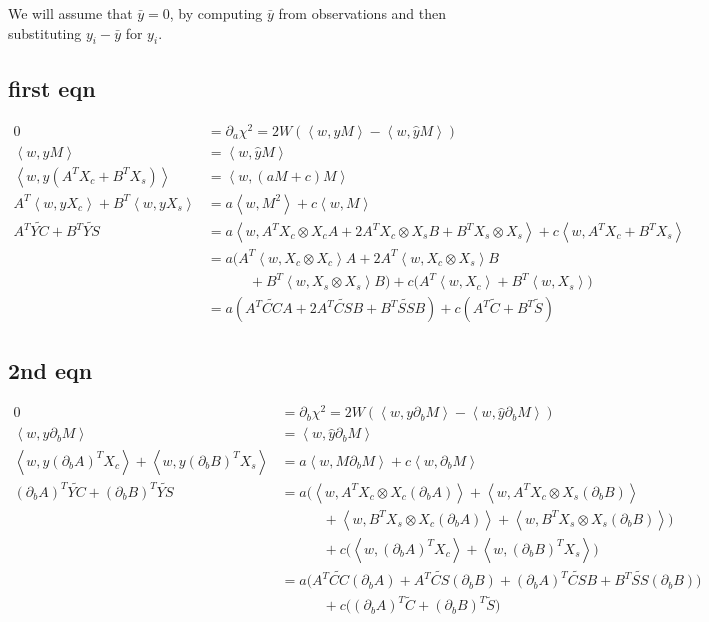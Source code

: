 \documentclass[notitlepage]{article}
\newcommand{\Cc}[1][n]{\widetilde{C}}
\newcommand{\Ss}[1][n]{\widetilde{S}}
\newcommand{\CCc}[1][nm]{\widetilde{CC}}
\newcommand{\SSs}[1][nm]{\widetilde{SS}}
\newcommand{\CS}[1][nm]{\widetilde{CS}}
\newcommand{\YC}[1][n]{\widetilde{YC}}
\newcommand{\YS}[1][n]{\widetilde{YS}}
\newcommand{\Xs}{X_s}
\newcommand{\Xc}{X_c}
\newcommand{\Ybar}{\bar{y}}
\newcommand{\dM}{\partial_bM}
\newcommand{\iprod}[2]{\left<#1, #2\right>}
\newcommand{\oprod}[2]{#1 \otimes #2}
\newcommand{\dA}{(\partial_b A)}
\newcommand{\dB}{(\partial_b B)}
\begin{document}
We will assume that $\Ybar = 0$, by computing $\Ybar$ from observations
and then substituting $y_i - \Ybar$ for $y_i$.

\subsection{first eqn}

\begin{align}
0 &= \partial_{a} \chi^2 = 2W\left(\iprod{w}{yM} - \iprod{w}{\hat{y}M}\right)\\
\iprod{w}{yM} &= \iprod{w}{\hat{y}M} \\
\iprod{w}{y(A^T\Xc + B^T\Xs)} &= \iprod{w}{(aM + c)M} \\
A^T\iprod{w}{y\Xc} + B^T\iprod{w}{y\Xs} &= a\iprod{w}{M^2} + c\iprod{w}{M}\\
A^T\YC + B^T \YS &= a\iprod{w}{A^T\oprod{\Xc}{\Xc}A + 2A^T\oprod{\Xc}{\Xs}B + B^T\oprod{\Xs}{\Xs}} + c\iprod{w}{A^T\Xc + B^T\Xs}\\
&= a\big(A^T\iprod{w}{\oprod{\Xc}{\Xc}}A + 2A^T\iprod{w}{\oprod{\Xc}{\Xs}}B \\
&\qquad\quad + B^T\iprod{w}{\oprod{\Xs}{\Xs}}B\big) + c\big(A^T\iprod{w}{\Xc} + B^T\iprod{w}{\Xs}\big)\\
&= a(A^T\CCc A + 2A^T\CS B + B^T\SSs B) + c(A^T\Cc + B^T\Ss)
\end{align}

\subsection{2nd eqn}

\begin{align}
0 &= \partial_{b} \chi^2 = 2W(\iprod{w}{y\dM} - \iprod{w}{\hat{y}\dM})\\
\iprod{w}{y\dM} &= \iprod{w}{\hat{y}\dM}\\
\iprod{w}{y\dA^T\Xc} + \iprod{w}{y\dB^T\Xs} &= a\iprod{w}{M\dM} + c\iprod{w}{\dM}\\
\dA^T\YC + \dB^T\YS &= a\big(\iprod{w}{A^T\oprod{\Xc}{\Xc}\dA} + \iprod{w}{A^T\oprod{\Xc}{\Xs}\dB} \\
					&\qquad\quad + \iprod{w}{B^T\oprod{\Xs}{\Xc}\dA} + \iprod{w}{B^T\oprod{\Xs}{\Xs}\dB}\big)\\
					&\qquad\quad + c\big(\iprod{w}{\dA^T\Xc} + \iprod{w}{\dB^T\Xs}\big)\\
					&= a\big(A^T\CCc \dA + A^T\CS\dB + \dA^T\CS B + B^T\SSs \dB\big) \\
					&\qquad\quad + c\big(\dA^T\Cc + \dB^T\Ss\big)
\end{align}
\end{document}
